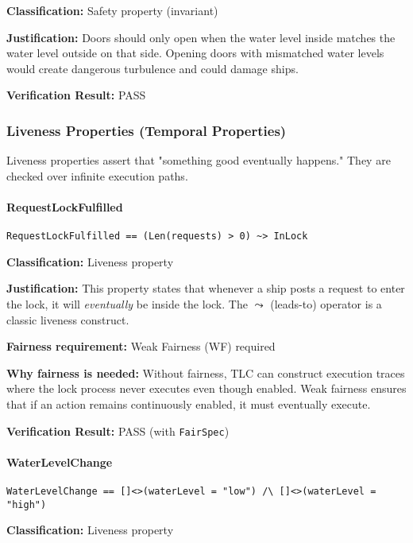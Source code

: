 \documentclass[12pt,a4paper]{article}
\begin{document}
\textbf{Classification:} Safety property (invariant)

\textbf{Justification:} Doors should only open when the water level inside matches the water level outside on that side. Opening doors with mismatched water levels would create dangerous turbulence and could damage ships.

\textbf{Verification Result:} \checkmark{} PASS

\subsubsection{Liveness Properties (Temporal Properties)}

Liveness properties assert that "something good eventually happens." They are checked over infinite execution paths.

\paragraph{RequestLockFulfilled}
\begin{lstlisting}[style=tlaplus]
RequestLockFulfilled == (Len(requests) > 0) ~> InLock
\end{lstlisting}

\textbf{Classification:} Liveness property

\textbf{Justification:} This property states that whenever a ship posts a request to enter the lock, it will \textit{eventually} be inside the lock. The $\leadsto$ (leads-to) operator is a classic liveness construct.

\textbf{Fairness requirement:} Weak Fairness (WF) required

\textbf{Why fairness is needed:}
Without fairness, TLC can construct execution traces where the lock process never executes even though enabled. Weak fairness ensures that if an action remains continuously enabled, it must eventually execute.

\textbf{Verification Result:} \checkmark{} PASS (with \texttt{FairSpec})

\paragraph{WaterLevelChange}
\begin{lstlisting}[style=tlaplus]
WaterLevelChange == []<>(waterLevel = "low") /\ []<>(waterLevel = "high")
\end{lstlisting}

\textbf{Classification:} Liveness property
\end{document}
